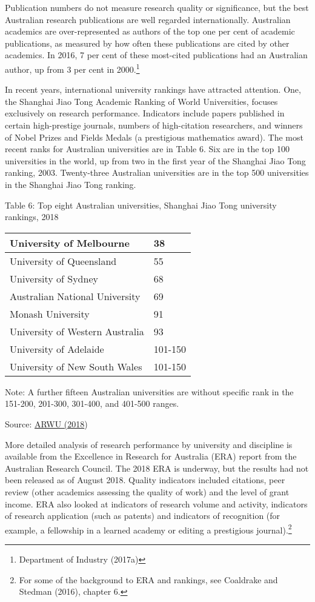 \documentclass[]{book}
\begin{document}
Publication numbers do not measure research quality or significance, but the best Australian research publications are well regarded internationally. Australian academics are over-represented as authors of the top one per cent of academic publications, as measured by how often these publications are cited by other academics. In 2016, 7 per cent of these most-cited publications had an Australian author, up from 3 per cent in 2000.\footnote{Department of Industry (2017a)}

In recent years, international university rankings have attracted attention. One, the Shanghai Jiao Tong Academic Ranking of World Universities, focuses exclusively on research performance. Indicators include papers published in certain high-prestige journals, numbers of high-citation researchers, and winners of Nobel Prizes and Fields Medals (a prestigious mathematics award). The most recent ranks for Australian universities are in Table 6. Six are in the top 100 universities in the world, up from two in the first year of the Shanghai Jiao Tong ranking, 2003. Twenty-three Australian universities are in the top 500 universities in the Shanghai Jiao Tong ranking.

\protect\hypertarget{_Ref315008720}{}{}Table 6: Top eight Australian universities, Shanghai Jiao Tong university rankings, 2018

\begin{longtable}[]{@{}ll@{}}
\toprule
University of Melbourne & 38\tabularnewline
\midrule
\endhead
University of Queensland & 55\tabularnewline
University of Sydney & 68\tabularnewline
Australian National University & 69\tabularnewline
Monash University & 91\tabularnewline
University of Western Australia & 93\tabularnewline
University of Adelaide & 101-150\tabularnewline
University of New South Wales & 101-150\tabularnewline
\bottomrule
\end{longtable}

Note: A further fifteen Australian universities are without specific rank in the 151-200, 201-300, 301-400, and 401-500 ranges.

Source: \protect\hyperlink{_ENREF_29}{ARWU (2018})

More detailed analysis of research performance by university and discipline is available from the Excellence in Research for Australia (ERA) report from the Australian Research Council. The 2018 ERA is underway, but the results had not been released as of August 2018. Quality indicators included citations, peer review (other academics assessing the quality of work) and the level of grant income. ERA also looked at indicators of research volume and activity, indicators of research application (such as patents) and indicators of recognition (for example, a fellowship in a learned academy or editing a prestigious journal).\footnote{For some of the background to ERA and rankings, see Coaldrake and Stedman (2016), chapter 6.}
\end{document}
